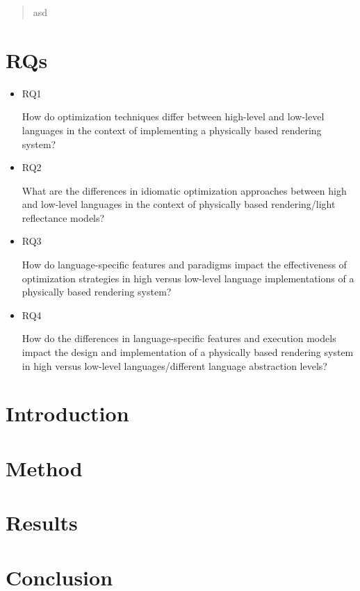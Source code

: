 \documentclass[12pt,a4paper]{article}
\begin{document}
% 

\begin{abstract}
    asd
\end{abstract}

\section{RQs}

\begin{itemize}[leftmargin=*, noitemsep]
    \item RQ1
    \begin{displayquote}
        How do optimization techniques differ between high-level and low-level languages in the context of implementing a physically based rendering system?
    \end{displayquote}
    \item RQ2
    \begin{displayquote}
        What are the differences in idiomatic optimization approaches between high and low-level languages in the context of physically based rendering/light reflectance models?
    \end{displayquote}
    \item RQ3
    \begin{displayquote}
        How do language-specific features and paradigms impact the effectiveness of optimization strategies in high versus low-level language implementations of a physically based rendering system? 
    \end{displayquote}
    \item RQ4
    \begin{displayquote}
        How do the differences in language-specific features and execution models impact the design and implementation of a physically based rendering system in high versus low-level languages/different language abstraction levels?
    \end{displayquote}
\end{itemize}

\section{Introduction}

\section{Method}

\section{Results}

\section{Conclusion}
\end{document}
